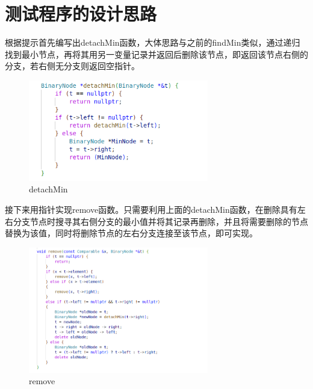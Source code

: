 \documentclass[UTF8]{ctexart}
\begin{document}
	
	\pagestyle{fancy}
	\fancyhead{}
	
	\section{测试程序的设计思路}
	
	根据提示首先编写出detachMin函数，大体思路与之前的findMin类似，通过递归找到最小节点，再将其用另一变量记录并返回后删除该节点，即返回该节点右侧的分支，若右侧无分支则返回空指针。
		
		\begin{figure}[H] %
			\centering %
			\includegraphics[width=0.7\textwidth]{fig1} %
			\caption{detachMin} %
		\end{figure}
		
	
	
	接下来用指针实现remove函数。只需要利用上面的detachMin函数，在删除具有左右分支节点时搜寻其右侧分支的最小值并将其记录再删除，并且将需要删除的节点替换为该值，同时将删除节点的左右分支连接至该节点，即可实现。
		
		\begin{figure}[H] %
			\centering %
			\includegraphics[width=0.7\textwidth]{fig2} %
			\caption{remove} %
		\end{figure}
		
\end{document}
